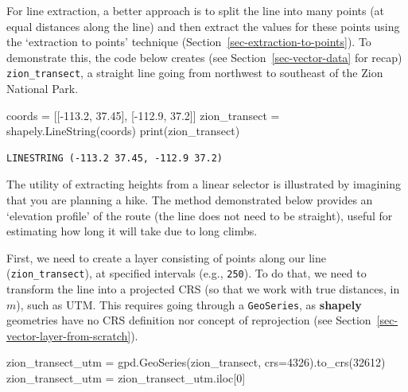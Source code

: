 \documentclass[
  letterpaper,
]{krantz}
\newenvironment{Shaded}{\begin{snugshade}}{\end{snugshade}}
\newcommand{\BuiltInTok}[1]{\textcolor[rgb]{0.00,0.23,0.31}{#1}}
\newcommand{\DecValTok}[1]{\textcolor[rgb]{0.68,0.00,0.00}{#1}}
\newcommand{\FloatTok}[1]{\textcolor[rgb]{0.68,0.00,0.00}{#1}}
\newcommand{\NormalTok}[1]{\textcolor[rgb]{0.00,0.23,0.31}{#1}}
\newcommand{\OperatorTok}[1]{\textcolor[rgb]{0.37,0.37,0.37}{#1}}
\begin{document}
For line extraction, a better approach is to split the line into many
points (at equal distances along the line) and then extract the values
for these points using the `extraction to points' technique
(Section~\ref{sec-extraction-to-points}). To demonstrate this, the code
below creates (see Section~\ref{sec-vector-data} for recap)
\texttt{zion\_transect}, a straight line going from northwest to
southeast of the Zion National Park.

\begin{Shaded}
\begin{Highlighting}[]
\NormalTok{coords }\OperatorTok{=}\NormalTok{ [[}\OperatorTok{{-}}\FloatTok{113.2}\NormalTok{, }\FloatTok{37.45}\NormalTok{], [}\OperatorTok{{-}}\FloatTok{112.9}\NormalTok{, }\FloatTok{37.2}\NormalTok{]]}
\NormalTok{zion\_transect }\OperatorTok{=}\NormalTok{ shapely.LineString(coords)}
\BuiltInTok{print}\NormalTok{(zion\_transect)}
\end{Highlighting}
\end{Shaded}

\begin{verbatim}
LINESTRING (-113.2 37.45, -112.9 37.2)
\end{verbatim}

The utility of extracting heights from a linear selector is illustrated
by imagining that you are planning a hike. The method demonstrated below
provides an `elevation profile' of the route (the line does not need to
be straight), useful for estimating how long it will take due to long
climbs.

First, we need to create a layer consisting of points along our line
(\texttt{zion\_transect}), at specified intervals (e.g., \texttt{250}).
To do that, we need to transform the line into a projected CRS (so that
we work with true distances, in \(m\)), such as UTM. This requires going
through a \texttt{GeoSeries}, as \textbf{shapely} geometries have no CRS
definition nor concept of reprojection (see
Section~\ref{sec-vector-layer-from-scratch}).

\begin{Shaded}
\begin{Highlighting}[]
\NormalTok{zion\_transect\_utm }\OperatorTok{=}\NormalTok{ gpd.GeoSeries(zion\_transect, crs}\OperatorTok{=}\DecValTok{4326}\NormalTok{).to\_crs(}\DecValTok{32612}\NormalTok{)}
\NormalTok{zion\_transect\_utm }\OperatorTok{=}\NormalTok{ zion\_transect\_utm.iloc[}\DecValTok{0}\NormalTok{]}
\end{Highlighting}
\end{Shaded}
\end{document}
